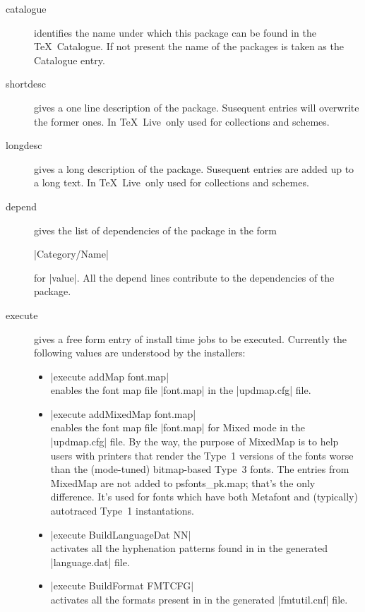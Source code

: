 \documentclass{arstexnica}
\newcommand{\tl}{\TeX~Live}
\begin{document}
\begin{article}
\begin{description}
\item[catalogue]
  identifies the name under which this package can be found in the \TeX\ 
  Catalogue. If not present the name of the packages is taken as the
  Catalogue entry.

\item[shortdesc]
  gives a one line description of the package. Susequent entries will
  overwrite the former ones. In \tl\ only used for collections and
  schemes. 

\item[longdesc]
  gives a long description of the package. Susequent entries are added
  up to a long text. In \tl\ only used for collections and
  schemes. 

\item[depend]
  gives the list of dependencies of the package in the form
  \begin{center}
    |Category/Name|
  \end{center}
  for |value|. All the depend lines contribute to the dependencies of
  the package. 

\item[execute]
  gives a free form entry of install time jobs to be
  executed. Currently the following values are understood by
  the installers: 
  \begin{itemize}
  \item |execute addMap font.map|\\
    enables the font map file |font.map| in the |updmap.cfg| file.
  \item |execute addMixedMap font.map|\\
    enables the font map file |font.map| for Mixed mode in the
    |updmap.cfg| file.  By the way,
    the purpose of MixedMap is to help users with printers that render
    the Type~1 versions of the fonts worse than the (mode-tuned) 
    bitmap-based Type~3 fonts. The entries from MixedMap are not
    added to psfonts\_pk.map; that's the only difference.  It's used for
    fonts which have both Metafont and (typically) autotraced Type~1
    instantations.

  \item |execute BuildLanguageDat NN|\\
    activates all the hyphenation patterns found in
     in the
    generated |language.dat| file.
  \item |execute BuildFormat FMTCFG|\\
    activates all the formats present in
    in the generated |fmtutil.cnf| file.
  \end{itemize}


\end{description}
\end{article}
\end{document}
